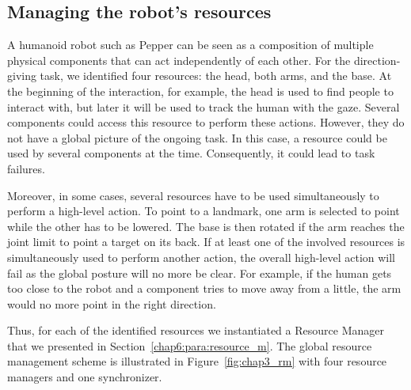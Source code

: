 \documentclass[a4paper,11pt,twoside]{StyleThese}
\begin{document}
\subsection{Managing the robot's resources}

A humanoid robot such as Pepper can be seen as a composition of multiple physical components that can act independently of each other. For the direction-giving task, we identified four resources: the head, both arms, and the base. At the beginning of the interaction, for example, the head is used to find people to interact with, but later it will be used to track the human with the gaze. Several components could access this resource to perform these actions. However, they do not have a global picture of the ongoing task. In this case, a resource could be used by several components at the time. Consequently, it could lead to task failures.

Moreover, in some cases, several resources have to be used simultaneously to perform a high-level action. To point to a landmark, one arm is selected to point while the other has to be lowered. The base is then rotated if the arm reaches the joint limit to point a target on its back. If at least one of the involved resources is simultaneously used to perform another action, the overall high-level action will fail as the global posture will no more be clear. For example, if the human gets too close to the robot and a component tries to move away from a little, the arm would no more point in the right direction.

Thus, for each of the identified resources we instantiated a Resource Manager that we presented in Section~\ref{chap6:para:resource_m}. The global resource management scheme is illustrated in Figure~\ref{fig:chap3_rm} with four resource managers and one synchronizer.
\end{document}
